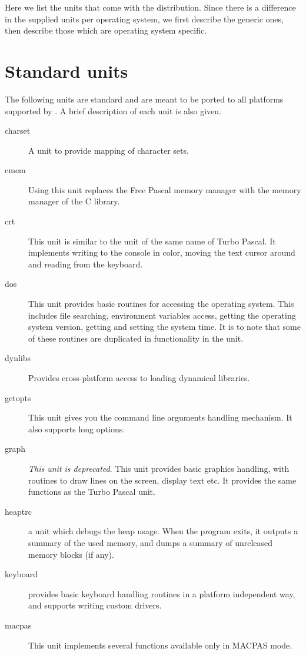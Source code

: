 Here we list the units that come with the \fpc distribution. Since there is
a difference in the supplied units per operating system, we first describe
the generic ones, then describe those which are operating system specific. 

%
%
\section{Standard units}

The following units are standard and are meant to be ported to
all platforms supported by \fpc. A brief description of each unit
is also given.

\begin{description}
\item[charset] A unit to provide mapping of character sets.
\item[cmem] Using this unit replaces the Free Pascal memory manager with the 
memory manager of the C library.
\item[crt] This unit is similar to the unit of the same name of
Turbo Pascal. It implements writing to the console in color,  moving the 
text cursor around and reading from the keyboard.
\item[dos] This unit provides basic routines for accessing the operating
system. This includes file searching, environment variables access,
getting the operating system version, getting and setting the
system time. It is to note that some of these routines are duplicated
in functionality in the  unit.
\item[dynlibs] Provides cross-platform access to loading dynamical libraries.
\item[getopts] This unit gives you the \gnu {} command line
arguments handling mechanism. It also supports long options.
\item[graph] \emph{This unit is deprecated}. This unit provides basic graphics handling, with routines to
draw lines on the screen, display text etc. It provides the same functions
as the Turbo Pascal unit. 
\item[heaptrc] a unit which debugs the heap usage. When the program exits, it outputs a summary of the used memory, and dumps a summary of unreleased memory blocks (if any).
\item[keyboard] provides basic keyboard handling routines in a platform independent way,
and supports writing custom drivers.
\item[macpas] This unit implements several functions available only in MACPAS mode. 

\end{description}
